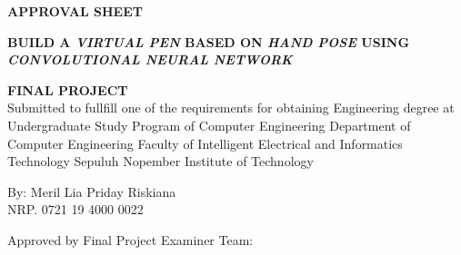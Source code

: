 \begin{center}
	\large
  \textbf{APPROVAL SHEET}
\end{center}

\thispagestyle{empty}

\begin{center}
  \textbf{BUILD A \emph{VIRTUAL PEN} BASED ON \emph{HAND POSE}
  USING \emph{CONVOLUTIONAL NEURAL NETWORK}}
\end{center}

\begingroup
  \small
  

  \begin{center}
    \textbf{FINAL PROJECT}
    \\Submitted to fullfill one of the requirements for obtaining Engineering degree at Undergraduate Study Program of Computer Engineering Department of Computer Engineering Faculty of Intelligent Electrical and Informatics Technology Sepuluh Nopember Institute of Technology
  \end{center}


  \begin{center}
    By: Meril Lia Priday Riskiana
    \\NRP. 0721 19 4000 0022
  \end{center}



  \begin{center}
    Approved by Final Project Examiner Team:
  \end{center}


  \begingroup
    \setlength{\tabcolsep}{0pt}

